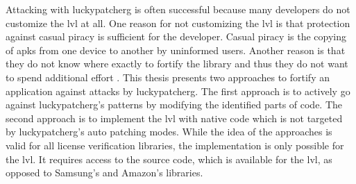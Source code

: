 Attacking with \gls{luckypatcherg} is often successful because many developers do not customize the \gls{lvl} at all.
One reason for not customizing the \gls{lvl} is that protection against casual piracy is sufficient for the developer.
Casual piracy is the copying of \gls{apk}s from one device to another by uninformed users.
\newline
Another reason is that they do not know where exactly to fortify the library and thus they do not want to spend additional effort \cite{developersSecuring}.
\newline
\newline
This thesis presents two approaches to fortify an application against attacks by \gls{luckypatcherg}.
\newline
The first approach is to actively go against \gls{luckypatcherg}'s patterns by modifying the identified parts of code.
\newline
The second approach is to implement the \gls{lvl} with native code which is not targeted by \gls{luckypatcherg}'s auto patching modes.
\newline
While the idea of the approaches is valid for all license verification libraries, the implementation is only possible for the \gls{lvl}.
It requires access to the source code, which is available for the \gls{lvl}, as opposed to Samsung’s and Amazon’s libraries.
